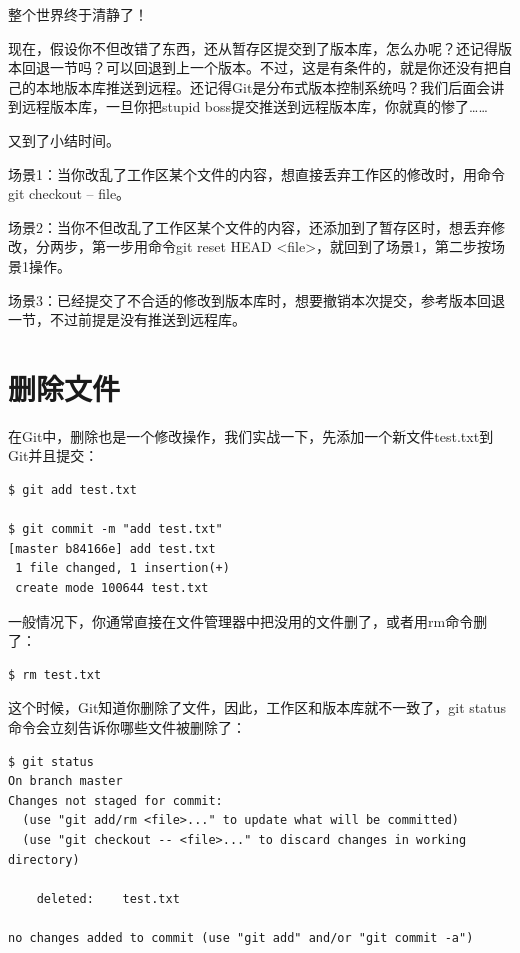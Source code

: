 整个世界终于清静了！

现在，假设你不但改错了东西，还从暂存区提交到了版本库，怎么办呢？还记得版本回退一节吗？可以回退到上一个版本。不过，这是有条件的，就是你还没有把自己的本地版本库推送到远程。还记得Git是分布式版本控制系统吗？我们后面会讲到远程版本库，一旦你把stupid boss提交推送到远程版本库，你就真的惨了……

\begin{tcolorbox}

又到了小结时间。

场景1：当你改乱了工作区某个文件的内容，想直接丢弃工作区的修改时，用命令git checkout -- file。

场景2：当你不但改乱了工作区某个文件的内容，还添加到了暂存区时，想丢弃修改，分两步，第一步用命令git reset HEAD <file>，就回到了场景1，第二步按场景1操作。

场景3：已经提交了不合适的修改到版本库时，想要撤销本次提交，参考版本回退一节，不过前提是没有推送到远程库。
\end{tcolorbox}

\section{删除文件}
在Git中，删除也是一个修改操作，我们实战一下，先添加一个新文件test.txt到Git并且提交：

\begin{verbatim}
$ git add test.txt

$ git commit -m "add test.txt"
[master b84166e] add test.txt
 1 file changed, 1 insertion(+)
 create mode 100644 test.txt
\end{verbatim}

一般情况下，你通常直接在文件管理器中把没用的文件删了，或者用rm命令删了：

\begin{verbatim}
$ rm test.txt
\end{verbatim}

这个时候，Git知道你删除了文件，因此，工作区和版本库就不一致了，git status命令会立刻告诉你哪些文件被删除了：

\begin{verbatim}
$ git status
On branch master
Changes not staged for commit:
  (use "git add/rm <file>..." to update what will be committed)
  (use "git checkout -- <file>..." to discard changes in working directory)

	deleted:    test.txt

no changes added to commit (use "git add" and/or "git commit -a")
\end{verbatim}

